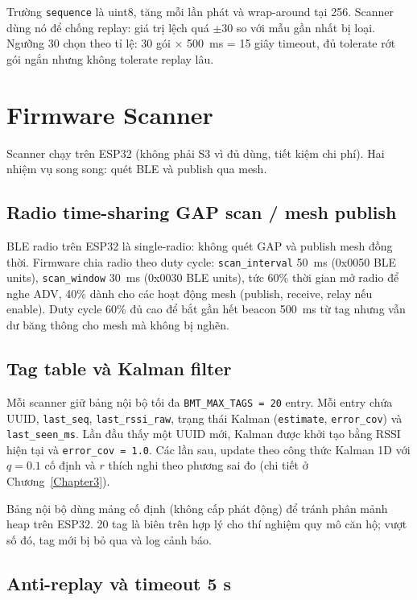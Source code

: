 Trường \texttt{sequence} là uint8, tăng mỗi lần phát và wrap-around tại 256. Scanner dùng nó để chống replay: giá trị lệch quá $\pm 30$ so với mẫu gần nhất bị loại. Ngưỡng 30 chọn theo tỉ lệ: 30 gói $\times$ 500~ms = 15 giây timeout, đủ tolerate rớt gói ngắn nhưng không tolerate replay lâu.

\section{Firmware Scanner}

Scanner chạy trên ESP32 (không phải S3 vì đủ dùng, tiết kiệm chi phí). Hai nhiệm vụ song song: quét BLE và publish qua mesh.

\subsection{Radio time-sharing GAP scan / mesh publish}

BLE radio trên ESP32 là single-radio: không quét GAP và publish mesh đồng thời. Firmware chia radio theo duty cycle: \texttt{scan\_interval} 50~ms (0x0050 BLE units), \texttt{scan\_window} 30~ms (0x0030 BLE units), tức 60\% thời gian mở radio để nghe ADV, 40\% dành cho các hoạt động mesh (publish, receive, relay nếu enable). Duty cycle 60\% đủ cao để bắt gần hết beacon 500~ms từ tag nhưng vẫn dư băng thông cho mesh mà không bị nghẽn.

\subsection{Tag table và Kalman filter}

Mỗi scanner giữ bảng nội bộ tối đa \texttt{BMT\_MAX\_TAGS = 20} entry. Mỗi entry chứa UUID, \texttt{last\_seq}, \texttt{last\_rssi\_raw}, trạng thái Kalman (\texttt{estimate}, \texttt{error\_cov}) và \texttt{last\_seen\_ms}. Lần đầu thấy một UUID mới, Kalman được khởi tạo bằng RSSI hiện tại và \texttt{error\_cov = 1.0}. Các lần sau, update theo công thức Kalman 1D với $q = 0.1$ cố định và $r$ thích nghi theo phương sai đo (chi tiết ở Chương~\ref{Chapter3}).

Bảng nội bộ dùng mảng cố định (không cấp phát động) để tránh phân mảnh heap trên ESP32. 20 tag là biên trên hợp lý cho thí nghiệm quy mô căn hộ; vượt số đó, tag mới bị bỏ qua và log cảnh báo.

\subsection{Anti-replay và timeout 5 s}

